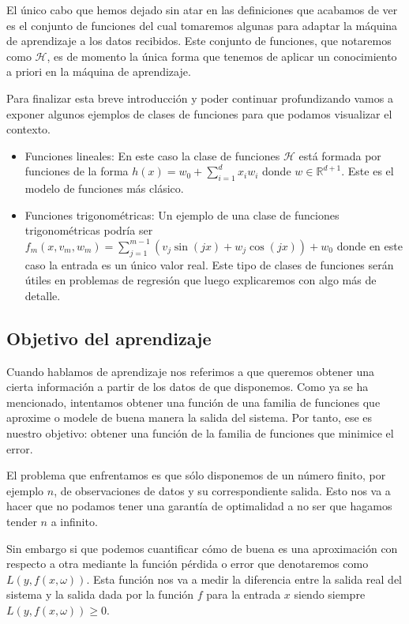 El único cabo que hemos dejado sin atar en las definiciones que acabamos de ver es el conjunto de funciones del cual tomaremos algunas para adaptar la máquina de aprendizaje a los datos recibidos. Este conjunto de funciones, que notaremos como $\mathcal{H}$, es de momento la única forma que tenemos de aplicar un conocimiento a priori en la máquina de aprendizaje.

Para finalizar esta breve introducción y poder continuar profundizando vamos a exponer algunos ejemplos de clases de funciones para que podamos visualizar el contexto.

\begin{itemize}
	\item Funciones lineales: En este caso la clase de funciones $\mathcal{H}$ está formada por funciones de la forma $h(x) = w_0 + \sum_{i=1}^{d}x_i w_i$ donde $w\in \mathbb{R}^{d+1}$. Este es el modelo de funciones más clásico.
	\item Funciones trigonométricas: Un ejemplo de una clase de funciones trigonométricas podría ser $f_m(x,v_m,w_m) = \sum_{j=1}^{m-1}(v_j \sin (jx) + w_j \cos (jx)) + w_0$ donde en este caso la entrada es un único valor real. Este tipo de clases de funciones serán útiles en problemas de regresión que luego explicaremos con algo más de detalle.
\end{itemize}

\subsection{Objetivo del aprendizaje}

Cuando hablamos de aprendizaje nos referimos a que queremos obtener una cierta información a partir de los datos de que disponemos. Como ya se ha mencionado, intentamos obtener una función de una familia de funciones que aproxime o modele de buena manera la salida del sistema. Por tanto, ese es nuestro objetivo: obtener una función de la familia de funciones que minimice el error.

El problema que enfrentamos es que sólo disponemos de un número finito, por ejemplo $n$, de observaciones de datos y su correspondiente salida. Esto nos va a hacer que no podamos tener una garantía de optimalidad a no ser que hagamos tender $n$ a infinito. 

Sin embargo si que podemos cuantificar cómo de buena es una aproximación con respecto a otra mediante la función pérdida o error que denotaremos como $L(y,f(x,\omega))$. Esta función nos va a medir la diferencia entre la salida real del sistema y la salida dada por la función $f$ para la entrada $x$ siendo siempre $L(y,f(x,\omega))\geq 0$.

